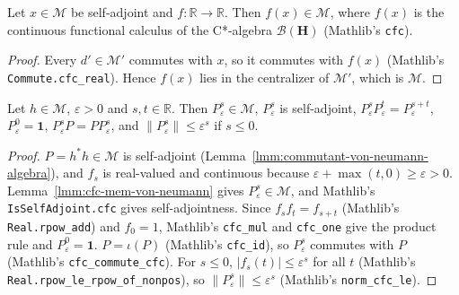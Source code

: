 \begin{lemma}
    \label{lmm:cfc-mem-von-neumann}
    \leanok
    Let $x \in \mathcal{M}$ be self-adjoint and $f : \mathbb{R} \to \mathbb{R}$. Then $f(x) \in \mathcal{M}$, where $f(x)$ is the continuous functional calculus of the C*-algebra $\mathcal{B}(\mathbf{H})$ (Mathlib's \texttt{cfc}).
\end{lemma}
\begin{proof}
    \leanok
    Every $d' \in \mathcal{M}'$ commutes with $x$, so it commutes with $f(x)$ (Mathlib's \texttt{Commute.cfc\_real}). Hence $f(x)$ lies in the centralizer of $\mathcal{M}'$, which is $\mathcal{M}$.
\end{proof}

\begin{lemma}
    \label{lmm:takesaki-shifted-powers}
    \leanok
    Let $h \in \mathcal{M}$, $\varepsilon > 0$ and $s, t \in \mathbb{R}$. Then $P_\varepsilon^s \in \mathcal{M}$, $P_\varepsilon^s$ is self-adjoint, $P_\varepsilon^sP_\varepsilon^t = P_\varepsilon^{s+t}$, $P_\varepsilon^0 = \mathbf{1}$, $P_\varepsilon^sP = PP_\varepsilon^s$, and $\|P_\varepsilon^s\| \le \varepsilon^s$ if $s \le 0$.
\end{lemma}
\begin{proof}
    \leanok
    $P = h^*h \in \mathcal{M}$ is self-adjoint (Lemma~\ref{lmm:commutant-von-neumann-algebra}), and $f_s$ is real-valued and continuous because $\varepsilon + \max(t, 0) \ge \varepsilon > 0$. Lemma~\ref{lmm:cfc-mem-von-neumann} gives $P_\varepsilon^s \in \mathcal{M}$, and Mathlib's \texttt{IsSelfAdjoint.cfc} gives self-adjointness. Since $f_sf_t = f_{s+t}$ (Mathlib's \texttt{Real.rpow\_add}) and $f_0 = 1$, Mathlib's \texttt{cfc\_mul} and \texttt{cfc\_one} give the product rule and $P_\varepsilon^0 = \mathbf{1}$. $P = \iota(P)$ (Mathlib's \texttt{cfc\_id}), so $P_\varepsilon^s$ commutes with $P$ (Mathlib's \texttt{cfc\_commute\_cfc}). For $s \le 0$, $|f_s(t)| \le \varepsilon^s$ for all $t$ (Mathlib's \texttt{Real.rpow\_le\_rpow\_of\_nonpos}), so $\|P_\varepsilon^s\| \le \varepsilon^s$ (Mathlib's \texttt{norm\_cfc\_le}).
\end{proof}

